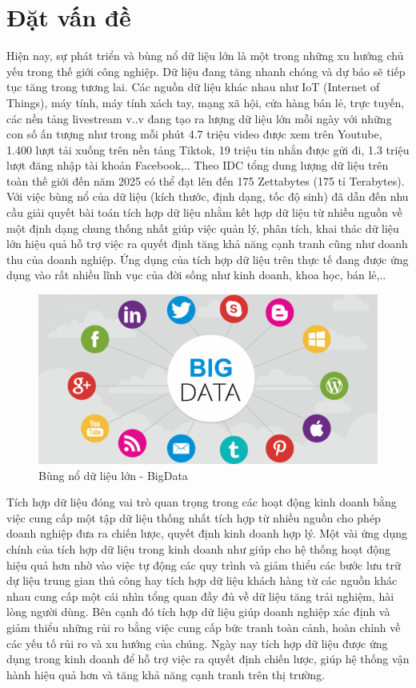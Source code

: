 \documentclass[../DoAn.tex]{subfiles}
\begin{document}
\section{Đặt vấn đề}
\label{section:1.1}
Hiện nay, sự phát triển và bùng nổ dữ liệu lớn là một trong những xu hướng chủ yếu trong thế giới công nghiệp. Dữ liệu đang tăng nhanh chóng và dự báo sẽ tiếp tục tăng trong tương lai. Các nguồn dữ liệu khác nhau như IoT (Internet of Things), máy tính, máy tính xách tay, mạng xã hội, cửa hàng bán lẻ, trực tuyến, các nền tảng livestream v..v đang tạo ra lượng dữ liệu lớn mỗi ngày với những con số ấn tượng như trong mỗi phút 4.7 triệu video được xem trên Youtube, 1.400 lượt tải xuống trên nền tảng Tiktok, 19 triệu tin nhắn được gửi đi, 1.3 triệu lượt đăng nhập tài khoản Facebook,.. Theo IDC tổng dung lượng dữ liệu trên toàn thế giới đến năm 2025 có thể đạt lên đến 175 Zettabytes (175 tỉ Terabytes). Với việc bùng nổ của dữ liệu (kích thước, định dạng, tốc độ sinh) đã dẫn đến nhu cầu giải quyết bài toán tích hợp dữ liệu nhằm kết hợp dữ liệu từ nhiều nguồn về một định dạng chung thống nhất giúp việc quản lý, phân tích, khai thác dữ liệu lớn hiệu quả hỗ trợ việc ra quyết định tăng khả năng cạnh tranh cũng như doanh thu của doanh nghiệp. Ứng dụng của tích hợp dữ liệu trên thực tế đang được ứng dụng vào rất nhiều lĩnh vục của đời sống như kinh doanh, khoa học, bán lẻ,.. 

\begin{figure}[H]
    \centering
    \includegraphics[scale=0.9]{Hinhve/bigdata.png}
    \caption{Bùng nổ dữ liệu lớn - BigData}
    \label{fig:my_label2}
\end{figure}

Tích hợp dữ liệu đóng vai trò quan trọng trong các hoạt động kinh doanh bằng việc cung cấp một tập dữ liệu thống nhất tích hợp từ nhiều nguồn cho phép doanh nghiệp đưa ra chiến lược, quyết định kinh doanh hợp lý. Một vài ứng dụng chính của tích hợp dữ liệu trong kinh doanh như giúp cho hệ thống hoạt động hiệu quả hơn nhờ vào việc tự động các quy trình và giảm thiểu các bước lưu trữ dự liệu trung gian thủ công hay tích hợp dữ liệu khách hàng từ các nguồn khác nhau cung cấp một cái nhìn tổng quan đầy đủ về dữ liệu tăng trải nghiệm, hài lòng người dùng. Bên cạnh đó tích hợp dữ liệu giúp doanh nghiệp xác định và giảm thiểu những rủi ro bằng việc cung cấp bức tranh toàn cảnh, hoàn chỉnh về các yếu tố rủi ro và xu hướng của chúng. Ngày nay tích hợp dữ liệu được ứng dụng trong kinh doanh để hỗ trợ việc ra quyết định chiến lược, giúp hệ thống vận hành hiệu quả  hơn và tăng khả năng cạnh tranh trên thị trường.
\end{document}
